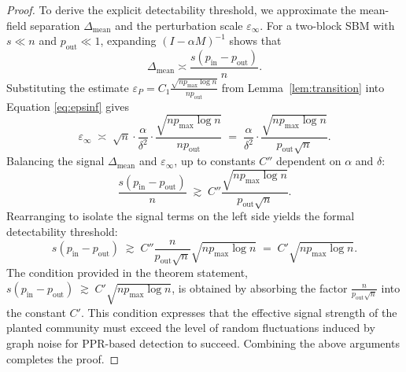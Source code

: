 \documentclass[11pt,english]{article}
\begin{document}
\begin{proof}
\vspace{3mm}
\noindent To derive the explicit detectability threshold, we approximate the mean-field separation $\Delta_{\mathrm{mean}}$
and the perturbation scale $\varepsilon_{\infty}$.
For a two-block SBM with $s \ll n$ and $p_{\mathrm{out}}\ll 1$, expanding $(I - \alpha M)^{-1}$ shows that
\[
\Delta_{\mathrm{mean}} \asymp \frac{s(p_{\mathrm{in}} - p_{\mathrm{out}})}{n}.
\]
Substituting the estimate
$\varepsilon_P = C_1\frac{\sqrt{n p_{\max}\log n}}{n p_{\mathrm{out}}}$
from Lemma~\ref{lem:transition} into Equation \eqref{eq:epsinf}
gives
\[
\varepsilon_{\infty}
\;\asymp\;
\sqrt{n}\cdot\frac{\alpha}{\delta^2}\cdot
\frac{\sqrt{n p_{\max}\log n}}{n p_{\mathrm{out}}}
\;=\;
\frac{\alpha}{\delta^2}\cdot
\frac{\sqrt{n p_{\max}\log n}}{p_{\mathrm{out}}\sqrt{n}}.
\]
Balancing the signal $\Delta_{\mathrm{mean}}$ and $\varepsilon_{\infty}$, up to constants $C''$ dependent on $\alpha$ and $\delta$:
\[
\frac{s(p_{\mathrm{in}} - p_{\mathrm{out}})}{n}
\;\gtrsim\;
C''\frac{\sqrt{n p_{\max}\log n}}{p_{\mathrm{out}}\sqrt{n}}.
\]
Rearranging to isolate the signal terms on the left side yields the formal detectability threshold:
\[
s(p_{\mathrm{in}} - p_{\mathrm{out}})
\;\gtrsim\;
C''\frac{n}{p_{\mathrm{out}}\sqrt{n}} \sqrt{n p_{\max}\log n}
\;=\;
C'\sqrt{np_{\max}\log n}.
\]
The condition provided in the theorem statement,
$s(p_{\mathrm{in}}-p_{\mathrm{out}}) \;\gtrsim\; C'\sqrt{n p_{\max}\log n}$, is obtained by absorbing the factor $\frac{n}{p_{\mathrm{out}}\sqrt{n}}$ into the constant $C'$. This condition expresses that the effective signal strength of the planted community must exceed the level of random fluctuations induced by graph noise for PPR-based detection to succeed. Combining the above arguments completes the proof.


\end{proof}



\end{document}
